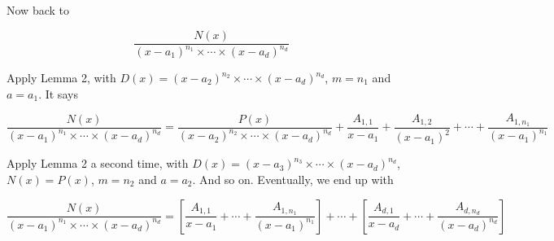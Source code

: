 Now back to

\[
    \frac{N(x)}{{(x-a_1)}^{n_1} \times \cdots \times {(x-a_d)}^{n_d}}
\]

Apply Lemma 2, with \(D(x) = {(x - a_2)}^{n_2} \times \cdots \times {(x - a_d)}^{n_d}\), \(m = n_1\) and \(a = a_1\). It says

\[
    \frac{N(x)}{{(x-a_1)}^{n_1} \times \cdots \times {(x-a_d)}^{n_d}} = \frac{P(x)}{{(x-a_2)}^{n_2} \times \cdots \times {(x-a_d)}^{n_d}} + \frac{A_{1,1}}{x-a_1} + \frac{A_{1,2}}{{(x-a_1)}^2} + \cdots + \frac{A_{1,n_1}}{{(x-a_1)}^{n_1}}
\]

Apply Lemma 2 a second time, with \(D(x) = {(x - a_3)}^{n_3} \times \cdots \times {(x - a_d)}^{n_d}\), \(N(x) = P(x)\),
\(m = n_2\) and \(a = a_2\). And so on. Eventually, we end up with

\[
    \frac{N(x)}{{(x-a_1)}^{n_1} \times \cdots \times {(x-a_d)}^{n_d}} = \left[ \frac{A_{1,1}}{x-a_1} + \cdots + \frac{A_{1,n_1}}{{(x-a_1)}^{n_1}} \right] + \cdots + \left[ \frac{A_{d,1}}{x-a_d} + \cdots + \frac{A_{d,n_d}}{{(x-a_d)}^{n_d}} \right]
\]
